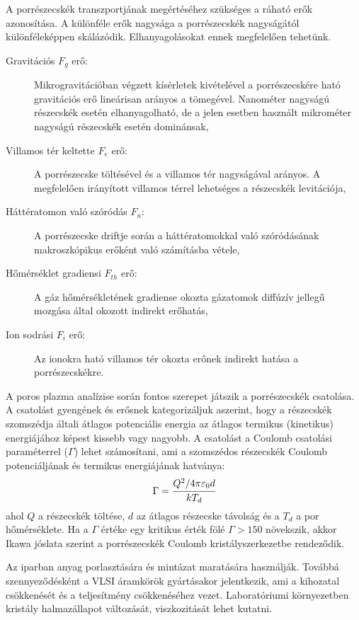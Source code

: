 	A porrészecskék transzportjának megértéséhez szükséges a ráható erők azonosítása.
	A különféle erők nagysága a porrészecskék nagyságától különféleképpen skálázódik. Elhanyagolásokat
	ennek megfelelően tehetünk.
	\begin{description}
		\item[Gravitációs $F_g$ erő:] Mikrogravitációban végzett kísérletek kivételével a porrészecskére
			ható gravitációs erő lineárisan arányos a tömegével. Nanométer nagyságú részecskék esetén
			elhanyagolható, de a jelen esetben használt mikrométer nagyságú részecskék esetén dominánsak,
		\item[Villamos tér keltette $F_e$ erő:] A porrészecske töltésével és a villamos tér nagyságával
			arányos. A megfelelően irányított villamos térrel lehetséges a részecskék levitációja,  
		\item[Háttératomon való szóródás $F_n$:] A porrészecske driftje során a háttératomokkal való
			szóródásának makroszkópikus erőként való számításba vétele,
		\item[Hőmérséklet gradiensi $F_{th}$ erő:] A gáz hőmérsékletének gradiense okozta
			gázatomok diffúzív jellegű mozgása által okozott indirekt erőhatás,
		\item[Ion sodrási $F_i$ erő:] Az ionokra ható villamos tér okozta erőnek indirekt hatása a
			porrészecskékre.
	\end{description}
	A poros plazma analízise során fontos szerepet játszik a porrészecskék csatolása.
	A csatolást gyengének és erősnek kategorizáljuk aszerint, hogy a részecskék szomszédja általi
	átlagos potenciális energia az átlagos termikus (kinetikus) energiájához képest kissebb vagy
	nagyobb.
	A csatolást a Coulomb csatolási paraméterrel ($\Gamma$) lehet számosítani, ami a szomszédos
	részecskék Coulomb potenciáljának és termikus energiájának hatványa:
	\begin{equation}
		\Gamma = \cfrac{Q^2 / 4\pi\varepsilon_0 d}{kT_d} 
	\end{equation}
	ahol $Q$ a részecskék töltése, $d$ az átlagos részecske távolság és a $T_d$ a por hőmérséklete.
	Ha a $\Gamma$ értéke egy kritikus érték fölé $\Gamma > 150$ növekszik, akkor
	Ikawa jóslata szerint a porrészecskék Coulomb kristályszerkezetbe rendeződik.
	
	Az iparban anyag porlasztására és mintázat maratására használják. Továbbá szennyeződésként a VLSI
	áramkörök gyártásakor jelentkezik, ami a kihozatal csökkenését és a teljesítmény csökkenéséhez
	vezet. Laboratóriumi környezetben kristály halmazállapot változását, viszkozitását lehet kutatni. 

